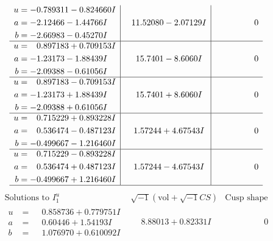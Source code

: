 \documentclass[1p]{elsarticle_modified}
\theoremstyle{definition}
\newcommand{\I}{\sqrt{-1}}
\begin{document}
$$\begin{array}{c|c|c}
\begin{aligned}
u &= -0.789311 - 0.824660 I \\
a &= -2.12466 - 1.44766 I \\
b &= -2.66983 - 0.45270 I\end{aligned}
 & \phantom{-}11.52080 - 2.07129 I & \phantom{-0.000000 } 0 \\ \hline\begin{aligned}
u &= \phantom{-}0.897183 + 0.709153 I \\
a &= -1.23173 - 1.88439 I \\
b &= -2.09388 - 0.61056 I\end{aligned}
 & \phantom{-}15.7401 - 8.6060 I & \phantom{-0.000000 } 0 \\ \hline\begin{aligned}
u &= \phantom{-}0.897183 - 0.709153 I \\
a &= -1.23173 + 1.88439 I \\
b &= -2.09388 + 0.61056 I\end{aligned}
 & \phantom{-}15.7401 + 8.6060 I & \phantom{-0.000000 } 0 \\ \hline\begin{aligned}
u &= \phantom{-}0.715229 + 0.893228 I \\
a &= \phantom{-}0.536474 - 0.487123 I \\
b &= -0.499667 - 1.216460 I\end{aligned}
 & \phantom{-}1.57244 + 4.67543 I & \phantom{-0.000000 } 0 \\ \hline\begin{aligned}
u &= \phantom{-}0.715229 - 0.893228 I \\
a &= \phantom{-}0.536474 + 0.487123 I \\
b &= -0.499667 + 1.216460 I\end{aligned}
 & \phantom{-}1.57244 - 4.67543 I & \phantom{-0.000000 } 0\\
 \hline 
 \end{array}$$\newpage$$\begin{array}{c|c|c}  
\text{Solutions to }I^u_{1}& \I (\text{vol} + \sqrt{-1}CS) & \text{Cusp shape}\\
 \hline 
\begin{aligned}
u &= \phantom{-}0.858736 + 0.779751 I \\
a &= \phantom{-}0.60446 + 1.54193 I \\
b &= \phantom{-}1.076970 + 0.610092 I\end{aligned}
 & \phantom{-}8.88013 + 0.82331 I & \phantom{-0.000000 } 0 \\ \hline\begin{aligned}

\end{aligned}
\end{array}$$
\end{document}
